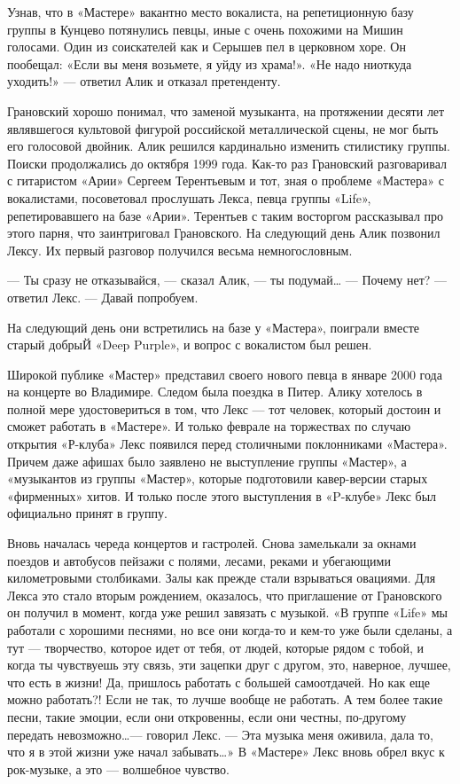 \documentclass[16pt,a5paper,oneside]{book}
\begin{document}
Узнав, что в «Мастере» вакантно место вокалиста, на репетиционную базу группы в Кунцево потянулись певцы, иные с очень
похожими на Мишин голосами. Один из соискателей как и Серышев пел в церковном хоре. Он пообещал: «Если вы меня возьмете,
я уйду из храма!». «Не надо ниоткуда уходить!» — ответил Алик и отказал претенденту.

Грановский хорошо понимал, что заменой музыканта, на протяжении десяти лет являвшегося культовой фигурой российской
металлической сцены, не мог быть его голосовой двойник. Алик решился кардинально изменить стилистику группы. Поиски
продолжались до октября 1999 года. Как-то раз Грановский разговаривал с гитаристом «Арии» Сергеем Терентьевым и тот,
зная о проблеме «Мастера» с вокалистами, посоветовал прослушать Лекса, певца группы «Life», репетировавшего на базе
«Арии». Терентьев с таким восторгом рассказывал про этого парня, что заинтриговал Грановского. На следующий день Алик
позвонил Лексу. Их первый разговор получился весьма немногословным.

— Ты сразу не отказывайся, — сказал Алик, — ты подумай\ldots
— Почему нет? — ответил Лекс. — Давай попробуем.

На следующий день они встретились на базе у «Мастера», поиграли вместе старый добрыЙ «Deep Purple», и вопрос с
вокалистом был решен.

Широкой публике «Мастер» представил своего нового певца в январе 2000 года на концерте во Владимире. Следом была поездка
в Питер. Алику хотелось в полной мере удостовериться в том, что Лекс — тот человек, который достоин и сможет работать в
«Мастере». И только феврале на торжествах по случаю открытия «Р-клуба» Лекс появился перед столичными поклонниками
«Мастера». Причем даже афишах было заявлено не выступление группы «Мастер», а «музыкантов из группы «Мастер», которые
подготовили кавер-версии старых «фирменных» хитов. И только после этого выступления в «P-клубе» Лекс был официально
принят в группу.

Вновь началась череда концертов и гастролей. Снова замелькали за окнами поездов и автобусов пейзажи с полями, лесами,
реками и убегающими километровыми столбиками. Залы как прежде стали взрываться овациями. Для Лекса это стало вторым
рождением, оказалось, что приглашение от Грановского он получил в момент, когда уже решил завязать с музыкой. «В группе
«Life» мы работали с хорошими песнями, но все они когда-то и кем-то уже были сделаны, а тут — творчество, которое идет
от тебя, от людей, которые рядом с тобой, и когда ты чувствуешь эту связь, эти зацепки друг с другом, это, наверное,
лучшее, что есть в жизни! Да, пришлось работать с большей самоотдачей. Но как еще можно работать?! Если не так, то лучше
вообще не работать. А тем более такие песни, такие эмоции, если они откровенны, если они честны, по-другому передать
невозможно\ldots — говорил Лекс. — Эта музыка меня оживила, дала то, что я в этой жизни уже начал забывать\ldots» В
«Мастере» Лекс вновь обрел вкус к рок-музыке, а это — волшебное чувство.
\end{document}
